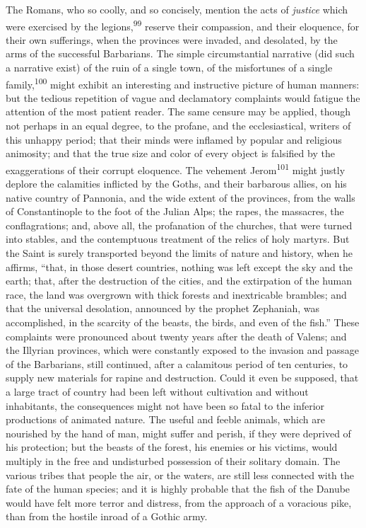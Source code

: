The Romans, who so coolly, and so concisely, mention the acts of
\textit{justice} which were exercised by the legions,\textsuperscript{99} reserve their
compassion, and their eloquence, for their own sufferings, when
the provinces were invaded, and desolated, by the arms of the
successful Barbarians. The simple circumstantial narrative (did
such a narrative exist) of the ruin of a single town, of the
misfortunes of a single family,\textsuperscript{100} might exhibit an interesting
and instructive picture of human manners: but the tedious
repetition of vague and declamatory complaints would fatigue the
attention of the most patient reader. The same censure may be
applied, though not perhaps in an equal degree, to the profane,
and the ecclesiastical, writers of this unhappy period; that
their minds were inflamed by popular and religious animosity; and
that the true size and color of every object is falsified by the
exaggerations of their corrupt eloquence. The vehement Jerom\textsuperscript{101}
might justly deplore the calamities inflicted by the Goths, and
their barbarous allies, on his native country of Pannonia, and
the wide extent of the provinces, from the walls of
Constantinople to the foot of the Julian Alps; the rapes, the
massacres, the conflagrations; and, above all, the profanation of
the churches, that were turned into stables, and the contemptuous
treatment of the relics of holy martyrs. But the Saint is surely
transported beyond the limits of nature and history, when he
affirms, “that, in those desert countries, nothing was left
except the sky and the earth; that, after the destruction of the
cities, and the extirpation of the human race, the land was
overgrown with thick forests and inextricable brambles; and that
the universal desolation, announced by the prophet Zephaniah, was
accomplished, in the scarcity of the beasts, the birds, and even
of the fish.” These complaints were pronounced about twenty years
after the death of Valens; and the Illyrian provinces, which were
constantly exposed to the invasion and passage of the Barbarians,
still continued, after a calamitous period of ten centuries, to
supply new materials for rapine and destruction. Could it even be
supposed, that a large tract of country had been left without
cultivation and without inhabitants, the consequences might not
have been so fatal to the inferior productions of animated
nature. The useful and feeble animals, which are nourished by the
hand of man, might suffer and perish, if they were deprived of
his protection; but the beasts of the forest, his enemies or his
victims, would multiply in the free and undisturbed possession of
their solitary domain. The various tribes that people the air, or
the waters, are still less connected with the fate of the human
species; and it is highly probable that the fish of the Danube
would have felt more terror and distress, from the approach of a
voracious pike, than from the hostile inroad of a Gothic army.

